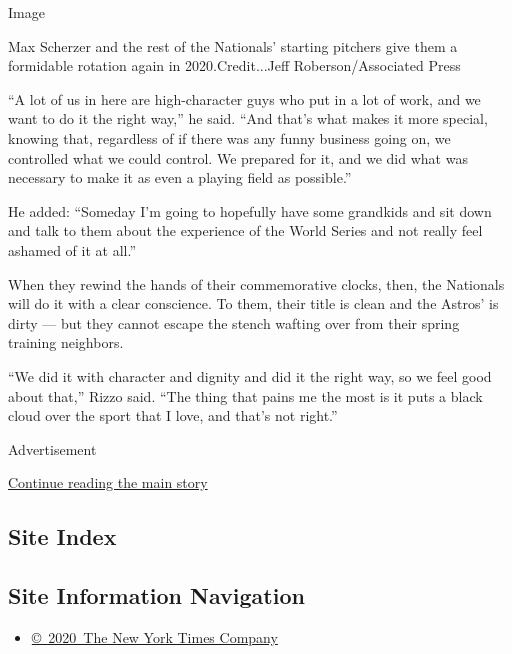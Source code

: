 Image

Max Scherzer and the rest of the Nationals' starting pitchers give them
a formidable rotation again in 2020.Credit...Jeff Roberson/Associated
Press

``A lot of us in here are high-character guys who put in a lot of work,
and we want to do it the right way,'' he said. ``And that's what makes
it more special, knowing that, regardless of if there was any funny
business going on, we controlled what we could control. We prepared for
it, and we did what was necessary to make it as even a playing field as
possible.''

He added: ``Someday I'm going to hopefully have some grandkids and sit
down and talk to them about the experience of the World Series and not
really feel ashamed of it at all.''

When they rewind the hands of their commemorative clocks, then, the
Nationals will do it with a clear conscience. To them, their title is
clean and the Astros' is dirty --- but they cannot escape the stench
wafting over from their spring training neighbors.

``We did it with character and dignity and did it the right way, so we
feel good about that,'' Rizzo said. ``The thing that pains me the most
is it puts a black cloud over the sport that I love, and that's not
right.''

Advertisement

\protect\hyperlink{after-bottom}{Continue reading the main story}

\hypertarget{site-index}{%
\subsection{Site Index}\label{site-index}}

\hypertarget{site-information-navigation}{%
\subsection{Site Information
Navigation}\label{site-information-navigation}}

\begin{itemize}
\tightlist
\item
  \href{https://help.nytimes3xbfgragh.onion/hc/en-us/articles/115014792127-Copyright-notice}{©~2020~The
  New York Times Company}
\end{itemize}

